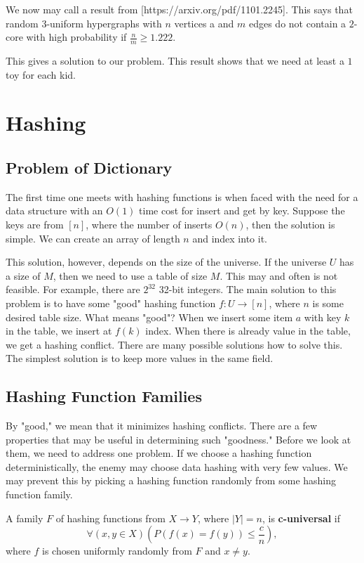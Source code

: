 We now may call a result from [https://arxiv.org/pdf/1101.2245]. This says that random 3-uniform hypergraphs with $n$ vertices a and $m$ edges do not contain a $2$-core with high probability if $\frac{n}{m} \geq 1.222$. 

This gives a solution to our problem. This result shows that we need at least a $1$ toy for each kid.

\section{Hashing}

\subsection{Problem of Dictionary}
The first time one meets with hashing functions is when faced with the need for a data structure with an \(O(1)\) time cost for insert and get by key. Suppose the keys are from \([n]\), where the number of inserts \(O(n)\), then the solution is simple. We can create an array of length \(n\) and index into it. 

This solution, however, depends on the size of the universe. If the universe $U$ has a size of $M$, then we need to use a table of size $M$. This may and often is not feasible. For example, there are $2^{32}$ 32-bit integers. The main solution to this problem is to have some "good" hashing function $f:U \rightarrow [n]$, where $n$ is some desired table size. What means "good"? When we insert some item $a$ with key $k$ in the table, we insert at $f(k)$ index. When there is already value in the table, we get a hashing conflict. There are many possible solutions how to solve this. The simplest solution is to keep more values in the same field.

\subsection{Hashing Function Families}
By "good," we mean that it minimizes hashing conflicts. There are a few properties that may be useful in determining such "goodness." Before we look at them, we need to address one problem. If we choose a hashing function deterministically, the enemy may choose data hashing with very few values. We may prevent this by picking a hashing function randomly from some hashing function family.

\begin{defn}
A family \( F \) of hashing functions from \( X \rightarrow Y \), where \( |Y| = n \), is \textbf{c-universal} if 
\[ \forall (x, y \in X) \left( P\left(f(x) = f(y)\right) \leq \frac{c}{n} \right), \]
where \( f \) is chosen uniformly randomly from \( F \) and \(x \neq y \).
\end{defn}

